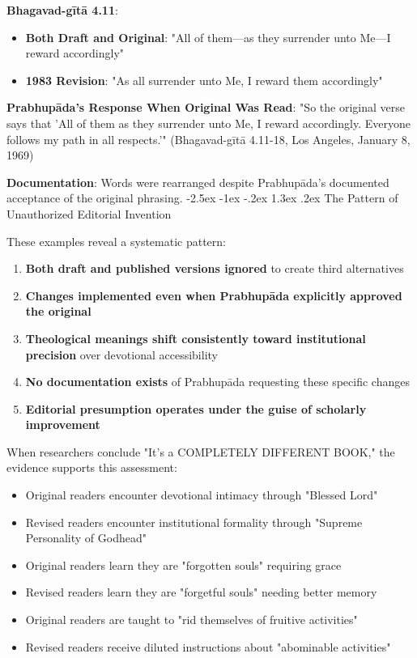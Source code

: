 \documentclass[12pt,twoside]{book}
\makeatletter
\renewcommand\section{\@startsection{section}{1}{\z@}%
{-2.5ex \@plus -1ex \@minus -.2ex}%
{1.3ex \@plus.2ex}%
{\normalfont\Large\bfseries}}
\makeatother
\begin{document}
\textbf{\textbf{Bhagavad-gītā 4.11}}:
\begin{itemize}
\item \textbf{\textbf{Both Draft and Original}}: "All of them—as they surrender unto Me—I reward accordingly"
\item \textbf{\textbf{1983 Revision}}: "As all surrender unto Me, I reward them accordingly"
\end{itemize}

\textbf{\textbf{Prabhupāda's Response When Original Was Read}}: "So the original verse says that 'All of them as they surrender unto Me, I reward accordingly. Everyone follows my path in all respects.'" (Bhagavad-gītā 4.11-18, Los Angeles, January 8, 1969)

\textbf{\textbf{Documentation}}: Words were rearranged despite Prabhupāda's documented acceptance of the original phrasing.
\section{The Pattern of Unauthorized Editorial Invention}
\label{sec:org23d85c3}

These examples reveal a systematic pattern:
\begin{enumerate}
\item \textbf{\textbf{Both draft and published versions ignored}} to create third alternatives
\item \textbf{\textbf{Changes implemented even when Prabhupāda explicitly approved the original}}
\item \textbf{\textbf{Theological meanings shift consistently toward institutional precision}} over devotional accessibility
\item \textbf{\textbf{No documentation exists}} of Prabhupāda requesting these specific changes
\item \textbf{\textbf{Editorial presumption operates under the guise of scholarly improvement}}
\end{enumerate}

When researchers conclude "It's a COMPLETELY DIFFERENT BOOK," the evidence supports this assessment:

\begin{itemize}
\item Original readers encounter devotional intimacy through "Blessed Lord"
\item Revised readers encounter institutional formality through "Supreme Personality of Godhead"
\item Original readers learn they are "forgotten souls" requiring grace
\item Revised readers learn they are "forgetful souls" needing better memory
\item Original readers are taught to "rid themselves of fruitive activities"
\item Revised readers receive diluted instructions about "abominable activities"
\end{itemize}
\end{document}
